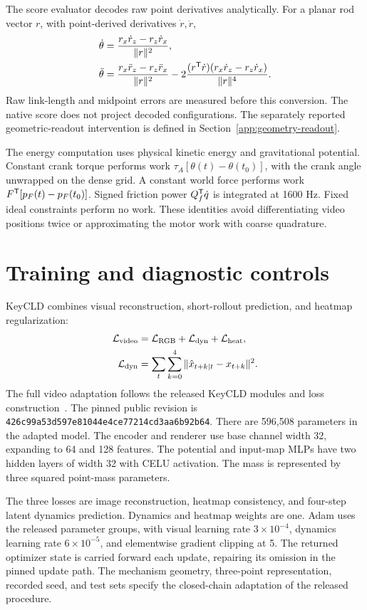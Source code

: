 The score evaluator decodes raw point derivatives analytically. For a planar rod vector $r$, with point-derived derivatives $\dot r,\ddot r$,
\begin{align}
\dot\theta&=\frac{r_x\dot r_z-r_z\dot r_x}{\|r\|^2},\\
\ddot\theta&=\frac{r_x\ddot r_z-r_z\ddot r_x}{\|r\|^2}
-2\frac{(r^{\mathsf T}\dot r)(r_x\dot r_z-r_z\dot r_x)}{\|r\|^4}.
\end{align}
Raw link-length and midpoint errors are measured before this conversion. The native score does not project decoded configurations. The separately reported geometric-readout intervention is defined in Section~\ref{app:geometry-readout}.

The energy computation uses physical kinetic energy and gravitational potential. Constant crank torque performs work $\tau_A[\theta(t)-\theta(t_0)]$, with the crank angle unwrapped on the dense grid. A constant world force performs work $F^{\mathsf T}[p_F(t)-p_F(t_0)]$. Signed friction power $Q_f^{\mathsf T}\dot q$ is integrated at 1600 Hz. Fixed ideal constraints perform no work. These identities avoid differentiating video positions twice or approximating the motor work with coarse quadrature.

\section{Training and diagnostic controls}
KeyCLD combines visual reconstruction, short-rollout prediction, and heatmap regularization:
\begin{equation}
\begin{aligned}
\mathcal L_{\rm video}&=\mathcal L_{\rm RGB}+\mathcal L_{\rm dyn}+\mathcal L_{\rm heat},\\
\mathcal L_{\rm dyn}&=\sum_t\sum_{k=0}^{4}\|\hat x_{t+k\mid t}-x_{t+k}\|^2.
\end{aligned}
\label{eq:learning}
\end{equation}
\label{app:training}
The full video adaptation follows the released KeyCLD modules and loss construction~\cite{daems2024keycld}. The pinned public revision is
\texttt{426c99a53d597e81044e4ce77214cd3aa6b92b64}.
There are 596,508 parameters in the adapted model. The encoder and renderer use base channel width 32, expanding to 64 and 128 features. The potential and input-map MLPs have two hidden layers of width 32 with CELU activation. The mass is represented by three squared point-mass parameters.

The three losses are image reconstruction, heatmap consistency, and four-step latent dynamics prediction. Dynamics and heatmap weights are one. Adam uses the released parameter groups, with visual learning rate $3\times10^{-4}$, dynamics learning rate $6\times10^{-5}$, and elementwise gradient clipping at 5. The returned optimizer state is carried forward each update, repairing its omission in the pinned update path. The mechanism geometry, three-point representation, recorded seed, and test sets specify the closed-chain adaptation of the released procedure.

